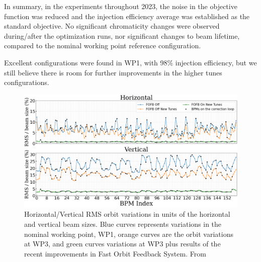 In summary, in the experiments throughout 2023, the noise in the objective function was reduced and the injection efficiency average was established as the standard objective. No significant chromaticity changes were observed during/after the optimization runs, nor significant changes to beam lifetime, compared to the nominal working point reference configuration.

Excellent configurations were found in WP1, with 98\% injection efficiency, but we still believe there is room for further improvements in the higher tunes configurations.
\begin{figure}[htb]
    \centering
    \includegraphics[width=\textwidth]{Images/WEOGA2_f5.png}
    \caption{Horizontal/Vertical RMS orbit variations in units of the horizontal and vertical beam sizes. Blue curves represents variations in the nominal working point, WP1, orange curves are the orbit variations at WP3, and green curves variations at WP3 plus results of the recent improvements in Fast Orbit Feedback System. From~\cite{Liu:IPAC23-WEOGA2}}
\end{figure}
